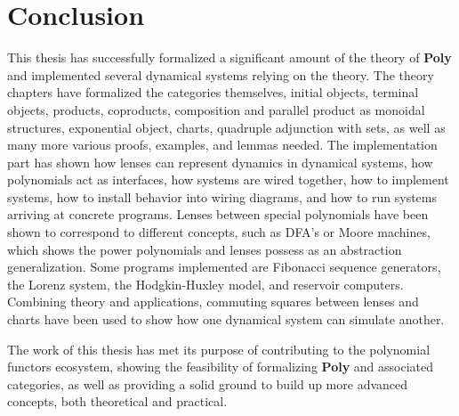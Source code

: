 \chapter{Conclusion}\label{chapter:conclusion}
This thesis has successfully formalized a significant amount of the theory of \textbf{Poly} and implemented several dynamical systems relying on the theory. 
The theory chapters have formalized the categories themselves, initial objects, terminal objects, products, coproducts, composition and parallel product as monoidal structures, exponential object, charts, quadruple adjunction with sets, as well as many more various proofs, examples, and lemmas needed. 
The implementation part has shown how lenses can represent dynamics in dynamical systems, how polynomials act as interfaces, how systems are wired together, how to implement systems, how to install behavior into wiring diagrams, and how to run systems arriving at concrete programs.
Lenses between special polynomials have been shown to correspond to different concepts, such as DFA's or Moore machines, which shows the power polynomials and lenses possess as an abstraction generalization.
Some programs implemented are Fibonacci sequence generators, the Lorenz system, the Hodgkin-Huxley model, and reservoir computers.
Combining theory and applications, commuting squares between lenses and charts have been used to show how one dynamical system can simulate another.

The work of this thesis has met its purpose of contributing to the polynomial functors ecosystem, showing the feasibility of formalizing \textbf{Poly} and associated categories, as well as providing a solid ground to build up more advanced concepts, both theoretical and practical. 
